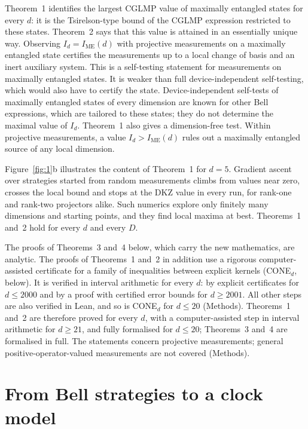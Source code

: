\documentclass[11pt]{article}
\newcommand{\IME}{I_{\mathrm{ME}}}
\begin{document}
\noindent Theorem~1 identifies the largest CGLMP value of maximally entangled states for every $d$: it is the
Tsirelson-type bound of the CGLMP expression restricted to these states. Theorem~2 says that this value is attained in
an essentially unique way. Observing $I_d=\IME(d)$ with projective measurements on a maximally entangled state certifies
the measurements up to a local change of basis and an inert auxiliary system. This is a self-testing
statement\cite{MayersYao2004,SupicBowles2020} for measurements on maximally entangled states. It is weaker than full
device-independent self-testing, which would also have to certify the state. Device-independent self-tests of
maximally entangled states of every dimension are known for other Bell expressions, which are tailored to these
states\cite{SATWAP2017,Kaniewski2019,SSKA2021}; they do not determine the maximal value of $I_d$. Theorem~1 also gives a
dimension-free test. Within projective measurements, a value $I_d>\IME(d)$ rules out a maximally entangled source of
any local dimension.

Figure~\ref{fig:1}b illustrates the content of Theorem~1 for $d=5$. Gradient ascent over strategies started from random
measurements climbs from values near zero, crosses the local bound and stops at the DKZ value in every run, for rank-one
and rank-two projectors alike. Such numerics explore only finitely many dimensions and starting points, and they find
local maxima at best. Theorems~1 and~2 hold for every $d$ and every $D$.

The proofs of Theorems~3 and~4 below, which carry the new mathematics, are analytic. The proofs of Theorems~1 and~2 in
addition use a rigorous computer-assisted certificate for a family of inequalities between explicit kernels (CONE$_d$,
below). It is verified in interval arithmetic for every $d$: by explicit certificates for $d\le2000$ and by a proof with
certified error bounds for $d\ge2001$. All other steps are also verified in Lean, and so is CONE$_d$ for $d\le20$
(Methods). Theorems~1 and~2 are therefore proved for every $d$, with a computer-assisted step in interval arithmetic
for $d\ge21$, and fully formalised for $d\le20$; Theorems~3 and~4 are formalised in full. The statements concern
projective measurements; general positive-operator-valued measurements are not covered (Methods).

\section*{From Bell strategies to a clock model}
\end{document}
